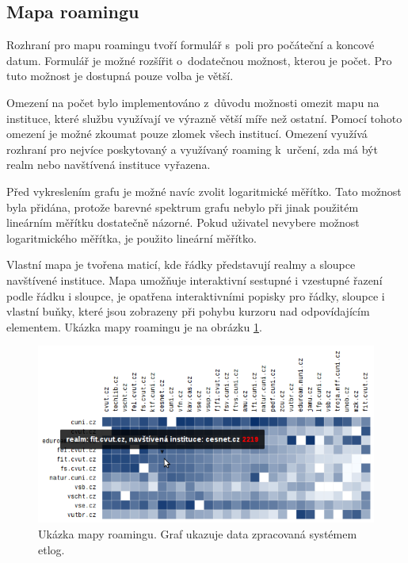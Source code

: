 \documentclass[thesis=M,czech]{FITthesis}[2012/06/26]
\begin{document}
    \subsection{Mapa roamingu}

      Rozhraní pro mapu roamingu tvoří formulář
      s~poli pro počáteční a koncové datum.
      Formulář je možné rozšířit o~dodatečnou možnost, kterou je počet.
      Pro tuto možnost je dostupná pouze volba je větší.

      Omezení na počet bylo implementováno z~důvodu možnosti omezit
      mapu na instituce, které službu využívají ve výrazně větší míře než ostatní.
      Pomocí tohoto omezení je možné zkoumat pouze zlomek všech institucí.
      Omezení využívá rozhraní pro nejvíce poskytovaný a využívaný roaming
      k~určení, zda má být realm nebo navštívená instituce vyřazena.

      Před vykreslením grafu je možné navíc zvolit logaritmické měřítko.
      Tato možnost byla přidána, protože barevné spektrum grafu nebylo při jinak
      použitém lineárním měřítku dostatečně názorné.
      Pokud uživatel nevybere možnost logaritmického měřítka, je použito lineární měřítko.

      Vlastní mapa je tvořena maticí, kde řádky představují realmy a sloupce navštívené instituce.
      Mapa umožňuje interaktivní sestupné i vzestupné řazení podle řádku i sloupce,
      je opatřena interaktivními popisky pro řádky, sloupce i vlastní buňky,
      které jsou zobrazeny při pohybu kurzoru nad odpovídajícím elementem.
      Ukázka mapy roamingu je na obrázku \ref{fig:heat_map}.

      \begin{figure}
        \centering
          \includegraphics[scale=0.5]{heat_map.png}
        \caption[Ukázka mapy roamingu]{Ukázka mapy roamingu. Graf ukazuje data zpracovaná systémem etlog.}
        \label{fig:heat_map}
      \end{figure}
\end{document}
